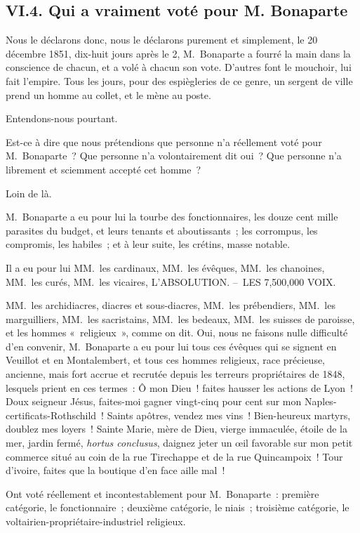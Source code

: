 \documentclass[french,twoside]{book} %
\begin{document}
\subsection[{VI.4. Qui a vraiment voté pour M. Bonaparte}]{VI.4. Qui a vraiment voté pour M. Bonaparte}
\noindent Nous le déclarons donc, nous le déclarons purement et simplement, le 20 décembre 1851, dix-huit jours après le 2, M. Bonaparte a fourré la main dans la conscience de chacun, et a volé à chacun son vote. D’autres font le mouchoir, lui fait l’empire. Tous les jours, pour des espiègleries de ce genre, un sergent de ville prend un homme au collet, et le mène au poste.\par
Entendons-nous pourtant.\par
Est-ce à dire que nous prétendions que personne n’a réellement voté pour M. Bonaparte ? Que personne n’a volontairement dit oui ? Que personne n’a librement et sciemment accepté cet homme ?\par
Loin de là.\par
M. Bonaparte a eu pour lui la tourbe des fonctionnaires, les douze cent mille parasites du budget, et leurs tenants et aboutissants ; les corrompus, les compromis, les habiles ; et à leur suite, les crétins, masse notable.\par
Il a eu pour lui MM. les cardinaux, MM. les évêques, MM. les chanoines, MM. les curés, MM. les vicaires, L’ABSOLUTION. – LES 7,500,000 VOIX.\par
MM. les archidiacres, diacres et sous-diacres, MM. les prébendiers, MM. les marguilliers, MM. les sacristains, MM. les bedeaux, MM. les suisses de paroisse, et les hommes « religieux », comme on dit. Oui, nous ne faisons nulle difficulté d’en convenir, M. Bonaparte a eu pour lui tous ces évêques qui se signent en Veuillot et en Montalembert, et tous ces hommes religieux, race précieuse, ancienne, mais fort accrue et recrutée depuis les terreurs propriétaires de 1848, lesquels prient en ces termes : Ô mon Dieu ! faites hausser les actions de Lyon ! Doux seigneur Jésus, faites-moi gagner vingt-cinq pour cent sur mon Naples-certificats-Rothschild ! Saints apôtres, vendez mes vins ! Bien-heureux martyrs, doublez mes loyers ! Sainte Marie, mère de Dieu, vierge immaculée, étoile de la mer, jardin fermé, \emph{hortus conclusus}, daignez jeter un œil favorable sur mon petit commerce situé au coin de la rue Tirechappe et de la rue Quincampoix ! Tour d’ivoire, faites que la boutique d’en face aille mal !\par
Ont voté réellement et incontestablement pour M. Bonaparte : première catégorie, le fonctionnaire ; deuxième catégorie, le niais ; troisième catégorie, le voltairien-propriétaire-industriel religieux.\par
\end{document}
